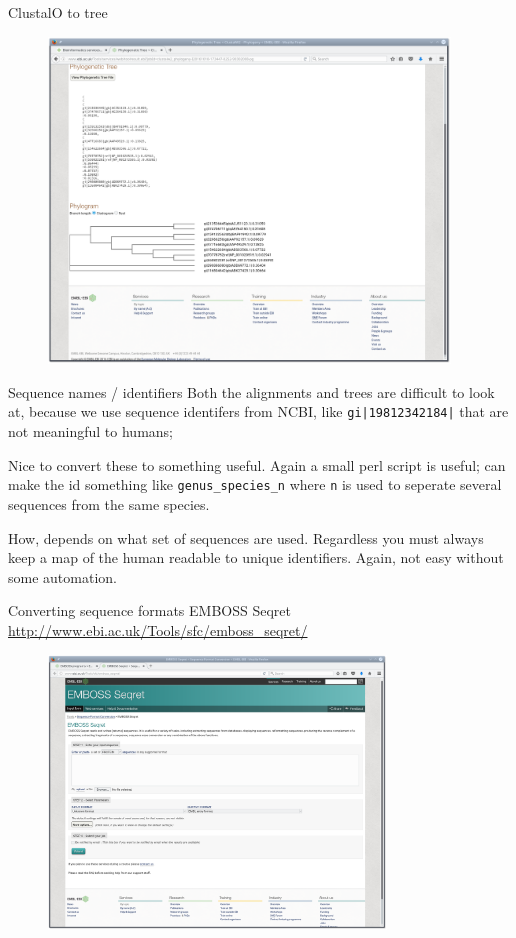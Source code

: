 \documentclass[pdf]{beamer}
\begin{document}
\begin{frame}{ClustalO to tree}
  \begin{figure}[ht]
    \includegraphics[width=0.95\textwidth]{images/ebi_clustalo_tree}
  \end{figure}
\end{frame}

\begin{frame}[fragile]{Sequence names / identifiers}
  Both the alignments and trees are difficult to look at, because we use
  sequence identifers from NCBI, like \verb#gi|19812342184|# that are not
  meaningful to humans;

  Nice to convert these to something useful. Again a small perl script is
  useful; can make the id something like \verb|genus_species_n| where
  \texttt{n} is used to seperate several sequences from the same species.
  
  How, depends on what set of sequences are used. Regardless you must always
  keep a map of the human readable to unique identifiers. Again, not easy
  without some automation.
\end{frame}

\begin{frame}{Converting sequence formats}
  EMBOSS Seqret \url{http://www.ebi.ac.uk/Tools/sfc/emboss_seqret/}
  \begin{figure}[ht]
    \includegraphics[width=0.8\textwidth]{images/emboss_seqret}
  \end{figure}
\end{frame}
\end{document}
